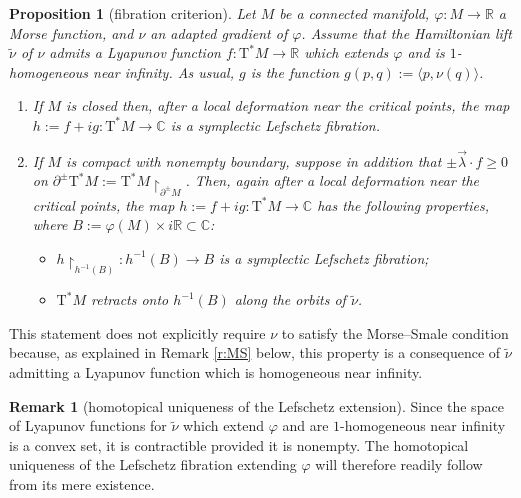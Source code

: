 \documentclass[10pt]{amsart}
\newenvironment{enumeratea}
{\bgroup\def\theenumi{\alph{enumi}}\begin{enumerate}}
{\end{enumerate}\egroup}
\newcommand{\C}{{\mathbb C}}
\newcommand{\R}{{\mathbb R}}
\newcommand{\tu}[1]{\textup{#1}}
\newcommand{\sT}{\mathrm{T}^\ast}
\newcommand{\hnu}{\tilde\nu}
\newcommand{\prg}[1]{\langle #1 \rangle}
\newcommand{\de}{\mathrel{:=}}
\newcommand{\rst}[1]{{\upharpoonright}_{\!#1}}
\let\del\partial
\let\on\colon
\theoremstyle{plain}
\newtheorem{proposition}[theorem]{Proposition}
\theoremstyle{definition}
\newtheorem{remark}[theorem]{Remark}
\begin{document}
\begin{proposition}[fibration criterion] \label{p:g}
Let $M$ be a connected manifold, $\varphi \on M \to \R$ a Morse function, and
$\nu$ an adapted gradient of $\varphi$. Assume that the Hamiltonian lift $\hnu$
of $\nu$ admits a Lyapunov function $f \on \sT M \to \R$ which extends $\varphi$
and is $1$-homogeneous near infinity. As usual, $g$ is the function $g(p,q)
\de \prg{p,\nu(q)}$.
\begin{enumeratea}
\item
If $M$ is closed then, after a local deformation near the critical points, the
map $h \de f+ig \on \sT M \to \C$ is a symplectic Lefschetz fibration.

\item
If $M$ is compact with nonempty boundary, suppose in addition that $\pm\vec
\lambda \cdot f \ge 0$ on $\del^\pm\sT M \de \sT M \rst{ \del^\pm M }$. Then,
again after a local deformation near the critical points, the map $h \de f+ig
\on \sT M \to \C$ has the following properties, where \hbox{$B \de \varphi(M) \times
i\R \subset \C$}\tu:
\begin{itemize}
\item
$h \rst{ h^{-1}(B) } \on h^{-1}(B) \to B$ is a symplectic Lefschetz
fibration\tu;
\item
$\sT M$ retracts onto $h^{-1}(B)$ along the orbits of $\hnu$.
\end{itemize}
\end{enumeratea}
\end{proposition}

This statement does not explicitly require $\nu$ to satisfy the Morse--Smale
condition because, as explained in Remark \ref{r:MS} below, this property is a
consequence of $\hnu$ admitting a Lyapunov function which is homogeneous near
infinity.

\begin{remark}[homotopical uniqueness of the Lefschetz extension] \label{r:one}
Since the space of Lyapunov functions for $\hnu$ which extend $\varphi$ and are
$1$-homogeneous near infinity is a convex set, it is contractible provided it
is nonempty. The homotopical uniqueness of the Lefschetz fibration extending
$\varphi$ will therefore readily follow from its mere existence.
\end{remark}
\end{document}
